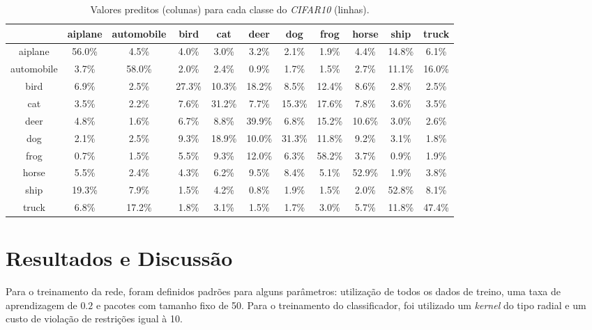 \documentclass[conference]{IEEEtran}
\begin{document}
\begin{table}[h]
\caption{Valores preditos (colunas) para cada classe do \textit{CIFAR10} (linhas).}
\begin{center}
\begin{tabular}{c|cccccccccc}
                  & aiplane  & automobile & bird        & cat         & deer     & dog       & frog       & horse    & ship       & truck     \\ \hline
aiplane       & 56.0\% &        4.5\% &   4.0\% &   3.0\% &   3.2\% &   2.1\% &   1.9\% &   4.4\% & 14.8\% &   6.1\% \\
automobile &   3.7\% &      58.0\% &   2.0\% &   2.4\% &   0.9\% &   1.7\% &   1.5\% &   2.7\% & 11.1\% & 16.0\% \\
bird            &   6.9\% &        2.5\% & 27.3\% & 10.3\% & 18.2\% &   8.5\% & 12.4\% &   8.6\% &   2.8\% &   2.5\% \\
cat             &   3.5\% &        2.2\% &   7.6\% & 31.2\% &   7.7\% & 15.3\% & 17.6\% &   7.8\% &   3.6\% &   3.5\% \\
deer           &   4.8\% &        1.6\% &   6.7\% &   8.8\% & 39.9\% &   6.8\% & 15.2\% & 10.6\% &   3.0\% &   2.6\% \\
dog             &   2.1\% &        2.5\% &   9.3\% & 18.9\% & 10.0\% & 31.3\% & 11.8\% &   9.2\% &   3.1\% &   1.8\% \\
frog            &   0.7\% &        1.5\% &   5.5\% &   9.3\% & 12.0\% &   6.3\% & 58.2\% &   3.7\% &   0.9\% &   1.9\% \\
horse          &   5.5\% &        2.4\% &   4.3\% &   6.2\% &   9.5\% &   8.4\% &   5.1\% & 52.9\% &   1.9\% &   3.8\% \\
ship             & 19.3\% &        7.9\% &   1.5\% &   4.2\% &   0.8\% &   1.9\% &   1.5\% &   2.0\% & 52.8\% &   8.1\% \\
truck           &   6.8\% &      17.2\% &   1.8\% &   3.1\% &   1.5\% &   1.7\% &   3.0\% &   5.7\% & 11.8\% & 47.4\%
\end{tabular}
\label{tabecifar}
\end{center}
\end{table}



\section{Resultados e Discussão} \label{Result}

Para o treinamento da rede, foram definidos padrões para alguns parâmetros: utilização de todos os dados de treino, uma taxa de aprendizagem de $0.2$ e pacotes com tamanho fixo de 50. Para o treinamento do classificador, foi utilizado um \textit{kernel} do tipo radial e um custo de violação de restrições igual à 10.
\end{document}

